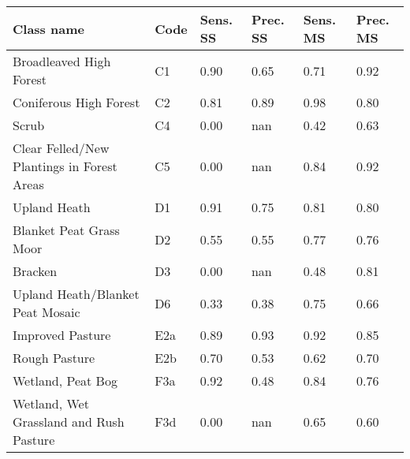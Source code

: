 \begin{tabular}{llllll}
\toprule
                       \textbf{Class name} & \textbf{Code} & \textbf{Sens. SS} & \textbf{Prec. SS} & \textbf{Sens. MS} & \textbf{Prec. MS} \\
\midrule
                   Broadleaved High Forest &            C1 &              0.90 &              0.65 &              0.71 &              0.92 \\
                    Coniferous High Forest &            C2 &              0.81 &              0.89 &              0.98 &              0.80 \\
                                     Scrub &            C4 &              0.00 &               nan &              0.42 &              0.63 \\
Clear Felled/New Plantings in Forest Areas &            C5 &              0.00 &               nan &              0.84 &              0.92 \\
                              Upland Heath &            D1 &              0.91 &              0.75 &              0.81 &              0.80 \\
                   Blanket Peat Grass Moor &            D2 &              0.55 &              0.55 &              0.77 &              0.76 \\
                                   Bracken &            D3 &              0.00 &               nan &              0.48 &              0.81 \\
          Upland Heath/Blanket Peat Mosaic &            D6 &              0.33 &              0.38 &              0.75 &              0.66 \\
                          Improved Pasture &           E2a &              0.89 &              0.93 &              0.92 &              0.85 \\
                             Rough Pasture &           E2b &              0.70 &              0.53 &              0.62 &              0.70 \\
                         Wetland, Peat Bog &           F3a &              0.92 &              0.48 &              0.84 &              0.76 \\
   Wetland, Wet Grassland and Rush Pasture &           F3d &              0.00 &               nan &              0.65 &              0.60 \\
\bottomrule
\end{tabular}
